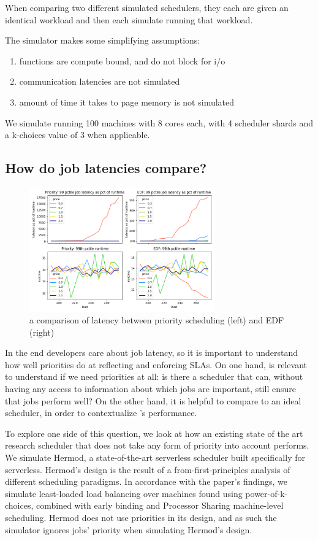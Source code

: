 When comparing two different simulated schedulers, they each are given an
identical workload and then each simulate running that workload.

The simulator makes some simplifying assumptions:
\begin{enumerate}
    \item functions are compute bound, and do not block for i/o
    \item communication latencies are not simulated
    \item amount of time it takes to page memory is not simulated
\end{enumerate}

We simulate running 100 machines with 8 cores each, with 4 scheduler shards and
a k-choices value of 3 when applicable.

\subsection{How do job latencies compare?}

\begin{figure}[t!]
    \centering
      \includegraphics[width=8cm]{img/ideal_edf_latency.png}
      \caption{ a comparison of latency between priority scheduling (left) and EDF (right) }
    \label{fig:edf-vs-prio}
\end{figure}

In the end developers care about job latency, so it is important to understand
how well priorities do at reflecting and enforcing SLAs. On one hand, is
relevant to understand if we need priorities at all: is there a scheduler that
can, without having any access to information about which jobs are important,
still ensure that jobs perform well? On the other hand, it is helpful to compare
\sys{} to an ideal scheduler, in order to contextualize \sys{}'s performance.

To explore one side of this question, we look at how an existing state of the
art research scheduler that does not take any form of priority into account
performs. We simulate Hermod\cite{TODO}, a state-of-the-art serverless scheduler
built specifically for serverless. Hermod's design is the result of a
from-first-principles analysis of different scheduling paradigms. In accordance
with the paper's findings, we simulate least-loaded load balancing over machines
found using power-of-k-choices, combined with early binding and Processor
Sharing machine-level scheduling. Hermod does not use priorities in its design,
and as such the simulator ignores jobs' priority when simulating Hermod's
design.


